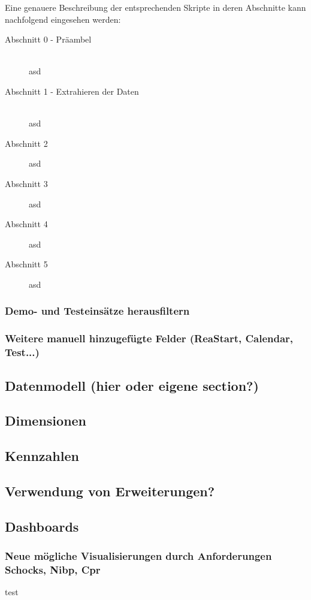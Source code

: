 Eine genauere Beschreibung der entsprechenden Skripte in deren Abschnitte kann nachfolgend eingesehen werden:
\begin{description}
\item[Abschnitt 0 - Präambel] \hfill \\
 asd
\item[Abschnitt 1 - Extrahieren der Daten]  \hfill \\
asd
\item[Abschnitt 2]asd
\item[Abschnitt 3]asd
\item[Abschnitt 4]asd
\item[Abschnitt 5]asd
\end{description}

\subsubsection{Demo- und Testeinsätze herausfiltern}
\label{subsub:testfilter}

\subsubsection{Weitere manuell hinzugefügte Felder (ReaStart, Calendar, Test...)}
\label{subsub:weitereFelder}


\subsection{Datenmodell (hier oder eigene section?)}
\label{sub:datenmodell}

\subsection{Dimensionen}
\subsection{Kennzahlen}
\subsection{Verwendung von Erweiterungen?}
\subsection{Dashboards}
\subsubsection{Neue mögliche Visualisierungen durch Anforderungen Schocks, Nibp, Cpr}
test
